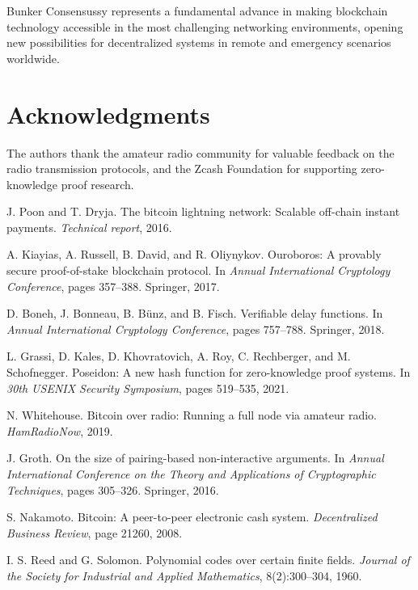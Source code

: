 \documentclass[11pt,a4paper]{article}
\begin{document}
Bunker Consensussy represents a fundamental advance in making blockchain technology accessible in the most challenging networking environments, opening new possibilities for decentralized systems in remote and emergency scenarios worldwide.

\section*{Acknowledgments}

The authors thank the amateur radio community for valuable feedback on the radio transmission protocols, and the Zcash Foundation for supporting zero-knowledge proof research.

\begin{thebibliography}{99}

J. Poon and T. Dryja.
\newblock The bitcoin lightning network: Scalable off-chain instant payments.
\newblock \emph{Technical report}, 2016.

A. Kiayias, A. Russell, B. David, and R. Oliynykov.
\newblock Ouroboros: A provably secure proof-of-stake blockchain protocol.
\newblock In \emph{Annual International Cryptology Conference}, pages 357--388. Springer, 2017.

D. Boneh, J. Bonneau, B. Bünz, and B. Fisch.
\newblock Verifiable delay functions.
\newblock In \emph{Annual International Cryptology Conference}, pages 757--788. Springer, 2018.

L. Grassi, D. Kales, D. Khovratovich, A. Roy, C. Rechberger, and M. Schofnegger.
\newblock Poseidon: A new hash function for zero-knowledge proof systems.
\newblock In \emph{30th USENIX Security Symposium}, pages 519--535, 2021.

N. Whitehouse.
\newblock Bitcoin over radio: Running a full node via amateur radio.
\newblock \emph{HamRadioNow}, 2019.

J. Groth.
\newblock On the size of pairing-based non-interactive arguments.
\newblock In \emph{Annual International Conference on the Theory and Applications of Cryptographic Techniques}, pages 305--326. Springer, 2016.

S. Nakamoto.
\newblock Bitcoin: A peer-to-peer electronic cash system.
\newblock \emph{Decentralized Business Review}, page 21260, 2008.

I. S. Reed and G. Solomon.
\newblock Polynomial codes over certain finite fields.
\newblock \emph{Journal of the Society for Industrial and Applied Mathematics}, 8(2):300--304, 1960.


\end{thebibliography}
\end{document}
